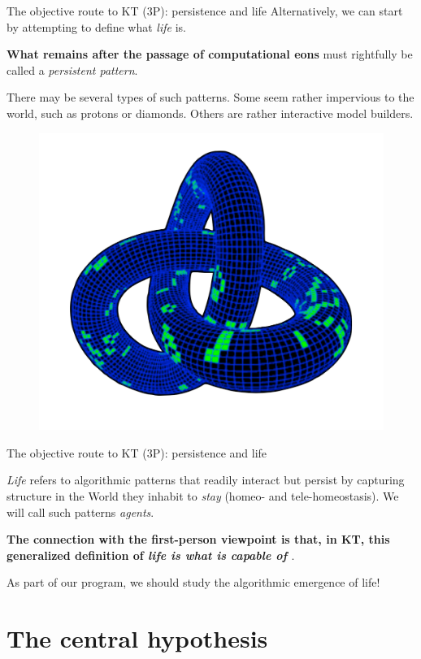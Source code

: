 \begin{frame}[label=intro4]{The objective route to KT (3P): persistence and life}
Alternatively, we can start by attempting to define what {\em life} is.\vfill

\textbf{What remains after the passage of computational eons} must rightfully be called a {\em persistent pattern}.\vfill

There may be several types of such patterns. Some seem rather impervious to the world, such as protons or diamonds. Others are rather interactive model builders. \vfill

\begin{figure}
    \centering
    \includegraphics[width=0.25\linewidth]{toruslife.png}
\end{figure}
\end{frame}

\begin{frame}[label=intro4]{The objective route to KT (3P): persistence and life}
\begin{definition}
\textit{Life} refers to algorithmic patterns that readily interact but persist by capturing structure in the World they inhabit to \textit{stay} (homeo- and tele-homeostasis). We will call such patterns \textit{agents}. \end{definition}\vfill

 {\bf The connection with the first-person viewpoint is that, in KT, this {generalized definition of \em life is what is capable of \SEP}}. \vfill 
 
 As part of our program, we should study the algorithmic emergence of life!
    \end{frame}

\section{The central hypothesis}

